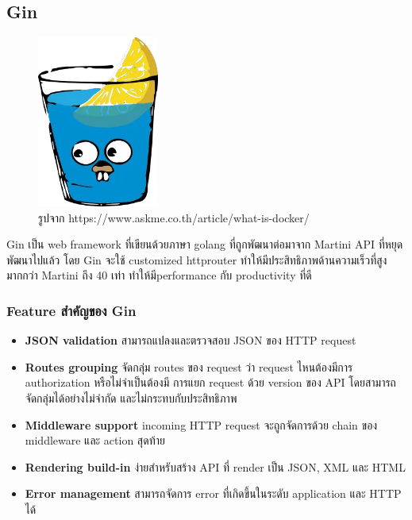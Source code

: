 \subsection{Gin}
\begin{figure}[H]
  \centering
  \includegraphics[width=40mm, keepaspectratio ]{pictures/gin.png}
  \caption[Poem]{รูปจาก https://www.askme.co.th/article/what-is-docker/}
  \label{fig:gin}
\end{figure}
\hspace{1.27cm}Gin\cite{Gin101} เป็น web framework ที่เขียนด้วยภาษา golang ที่ถูกพัฒนาต่อมาจาก Martini API ที่หยุดพัฒนาไปแล้ว โดย Gin จะใช้ customized httprouter ทำให้มีประสิทธิภาพด้านความเร็วที่สูงมากกว่า Martini ถึง 40 \cite{GinFeature}เท่า ทำให้มีperformance กับ productivity ที่ดี 

\subsubsection{Feature สำคัญของ Gin }
\begin{itemize}
  \item \textbf{JSON validation} สามารถแปลงและตรวจสอบ JSON ของ HTTP request
  \item \textbf{Routes grouping} จัดกลุ่ม routes ของ request ว่า request ไหนต้องมีการ authorization หรือไม่จำเป็นต้องมี การแยก request ด้วย version ของ API โดยสามารถจัดกลุ่มได้อย่างไม่จำกัด และไม่กระทบกับประสิทธิภาพ
  \item \textbf{Middleware support} incoming HTTP request จะถูกจัดการด้วย chain ของ middleware และ action สุดท้าย
  \item \textbf{Rendering build-in} ง่ายสำหรับสร้าง API ที่ render เป็น JSON, XML และ HTML
  \item \textbf{Error management} สามารถจัดการ error ที่เกิดขึ้นในระดับ application และ HTTP ได้
\end{itemize}

